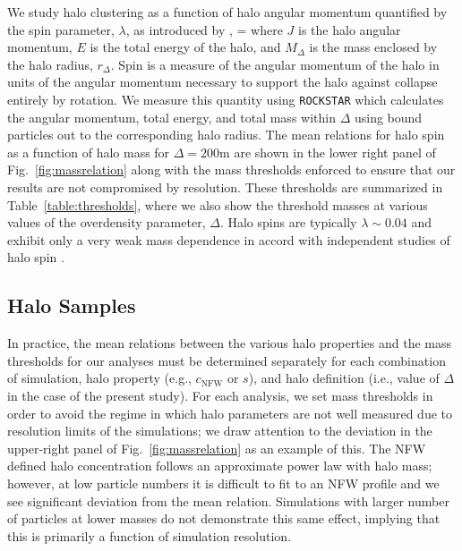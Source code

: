\documentclass[usenatbib,fleqn]{mnras}
\begin{document}
We study halo clustering as a function of halo angular momentum quantified by the spin parameter, $\lambda$, as introduced by \citep{peebles69},
\beq
\lambda = 
\eeq
where $J$ is the halo angular momentum, $E$ is the total energy of the halo, and $M_{\Delta}$ is the mass enclosed by the halo radius, $r_{\Delta}$. Spin is a measure of the angular momentum of the halo in units of the angular momentum necessary to support the halo against collapse entirely by rotation. We measure this quantity using {\tt ROCKSTAR} which calculates the angular momentum, total energy, and total mass within $\Delta$ using bound particles out to the corresponding halo radius. The mean relations for halo spin as a function of halo mass for $\Delta=200$m are shown in the lower right panel of Fig.~\ref{fig:massrelation} along with the mass thresholds enforced to ensure that our results are not compromised by resolution. These thresholds are summarized in Table~\ref{table:thresholds}, where we also show the threshold masses at various values of the overdensity parameter, $\Delta$. Halo spins are typically $\lambda \sim 0.04$ and exhibit only a very weak mass dependence in accord with independent studies of halo spin 
\citep[e.g.][]{bullock_etal02,maccio_etal07}.

\subsection{Halo Samples}

In practice, the mean relations between the various halo properties and the mass 
thresholds for our analyses must be determined separately for each combination of simulation, halo property (e.g., $c_{\mathrm{NFW}}$ or $s$), and halo definition (i.e., value of $\Delta$ in the case of the present study). For each analysis, we set mass thresholds in order to avoid the regime in which halo parameters are not well measured due to resolution limits of the simulations; we draw attention to the deviation in the upper-right panel of Fig.~\ref{fig:massrelation} as an example of this. The NFW defined halo concentration follows an approximate power law with halo mass; however, at low particle numbers it is difficult to fit to an NFW profile and we see significant deviation from the mean relation. Simulations with larger number of particles at lower masses do not demonstrate this same effect, implying that this is primarily a function of simulation resolution.
\end{document}
